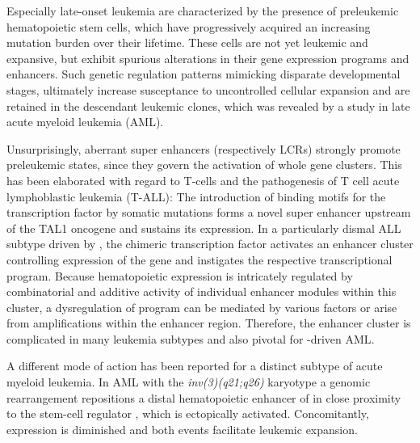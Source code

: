 Especially late-onset leukemia are characterized by the presence of preleukemic hematopoietic stem cells, which have progressively acquired an increasing mutation burden over their lifetime. These cells are not yet leukemic and expansive, but exhibit spurious alterations in their gene expression programs and enhancers. Such genetic regulation patterns mimicking disparate developmental stages, ultimately increase susceptance to uncontrolled cellular expansion and are retained in the descendant leukemic clones, which was revealed by a study in late acute myeloid leukemia (AML)\cite{Corces2016}. 

Unsurprisingly, aberrant super enhancers (respectively LCRs) strongly promote preleukemic states, since they govern the activation of whole gene clusters. This has been elaborated with regard to T-cells and the pathogenesis of T cell acute lymphoblastic leukemia (T-ALL): The introduction of binding motifs for the  transcription factor by somatic mutations forms a novel super enhancer upstream of the TAL1 oncogene and sustains its expression\cite{Mansour2014,Vahedi2015}. In a particularly dismal ALL subtype driven by , the chimeric transcription factor activates an enhancer cluster controlling expression of the  gene and instigates the respective transcriptional program\cite{Huang2019}. Because hematopoietic  expression is intricately regulated by combinatorial and additive activity of individual enhancer modules within this cluster\cite{Bahr2018}, a dysregulation of  program can be mediated by various factors or arise from amplifications within the enhancer region\cite{Shi2013}. Therefore, the enhancer cluster is complicated in many leukemia subtypes and also pivotal for \mllafnine-driven AML\cite{Bahr2018}. 

A different mode of action has been reported for a distinct subtype of acute myeloid leukemia. In AML with the \emph{inv(3)(q21;q26)} karyotype\cite{Arber2016} a genomic rearrangement repositions a distal hematopoietic enhancer of  in close proximity to the stem-cell regulator , which is ectopically activated. Concomitantly,  expression is diminished and both events facilitate leukemic expansion\cite{Yamazaki2014,Groeschel2014}. 




